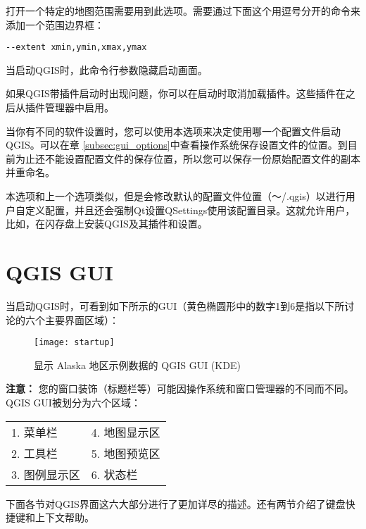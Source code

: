 打开一个特定的地图范围需要用到此选项。需要通过下面这个用逗号分开的命令来添加一个范围边界框：

\begin{verbatim}
--extent xmin,ymin,xmax,ymax
\end{verbatim}

当启动QGIS时，此命令行参数隐藏启动画面。

如果QGIS带插件启动时出现问题，你可以在启动时取消加载插件。这些插件在之后从插件管理器中启用。

当你有不同的软件设置时，您可以使用本选项来决定使用哪一个配置文件启动QGIS。可以在章 \ref{subsec:gui_options}中查看操作系统保存设置文件的位置。到目前为止还不能设置配置文件的保存位置，所以您可以保存一份原始配置文件的副本并重命名。

本选项和上一个选项类似，但是会修改默认的配置文件位置（～/.qgis）以进行用户自定义配置，并且还会强制Qt设置QSettings使用该配置目录。这就允许用户，比如，在闪存盘上安装QGIS及其插件和设置。

\section{QGIS GUI}
\label{label_qgismainwindow}

当启动QGIS时，可看到如下所示的GUI（黄色椭圆形中的数字1到6是指以下所讨论的六个主要界面区域）：

\begin{figure}[ht]
   \centering
    \texttt{[image: startup]}
    \caption{显示 Alaska 地区示例数据的 QGIS GUI \nixcaption (KDE)} \label{fig:startup}
\end{figure}

\textbf{注意：} 您的窗口装饰（标题栏等）可能因操作系统和窗口管理器的不同而不同。\\

QGIS GUI被划分为六个区域：

\begin{tabular}{p{5cm} p{5cm}}
1. 菜单栏  & 4. 地图显示区 \\
2. 工具栏 & 5. 地图预览区 \\
3. 图例显示区 & 6. 状态栏 \\
\end{tabular}

下面各节对QGIS界面这六大部分进行了更加详尽的描述。还有两节介绍了键盘快捷键和上下文帮助。

